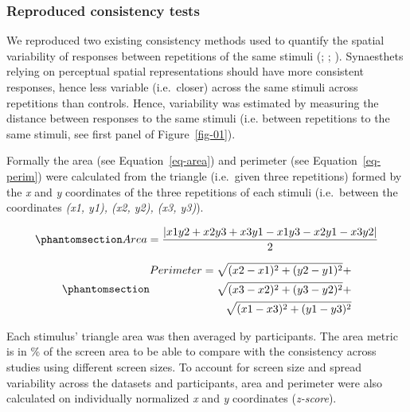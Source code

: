 \documentclass[
  man,
  floatsintext,
  longtable,
  a4paper,
  nolmodern,
  notxfonts,
  notimes,
  colorlinks=true,linkcolor=blue,citecolor=blue,urlcolor=blue]{apa7}
\begin{document}
\subsubsection{Reproduced consistency
tests}\label{reproduced-consistency-tests}

We reproduced two existing consistency methods used to quantify the
spatial variability of responses between repetitions of the same stimuli
(;
;
). Synaesthets relying on perceptual
spatial representations should have more consistent responses, hence
less variable (i.e.~closer) across the same stimuli across repetitions
than controls. Hence, variability was estimated by measuring the
distance between responses to the same stimuli (i.e. between repetitions
to the same stimuli, see first panel of Figure~\ref{fig-01}).

Formally the area (see Equation~\ref{eq-area}) and perimeter (see
Equation~\ref{eq-perim}) were calculated from the triangle (i.e.~given
three repetitions) formed by the \emph{x} and \emph{y} coordinates of
the three repetitions of each stimuli (i.e.~between the coordinates
\emph{(x1, y1), (x2, y2), (x3, y3)}).

\begin{equation}\protect\phantomsection\label{eq-area}{Area = \frac{|x1y2  +  x2y3  +  x3y1 \mathbin{-} x1y3 \mathbin{-}  x2y1 \mathbin{-} x3y2|}{2}}\end{equation}

\begin{equation}\protect\phantomsection\label{eq-perim}{\begin{split}
Perimeter = \sqrt{(x2 \mathbin{-} x1)^2 + (y2 \mathbin{-} y1)^2} + \\ \sqrt{(x3 \mathbin{-} x2)^2 + (y3 \mathbin{-} y2)^2} + \\ \sqrt{(x1 \mathbin{-}  x3)^2 + (y1 \mathbin{-} y3)^2}
\end{split}}\end{equation}

Each stimulus' triangle area was then averaged by participants. The area
metric is in \% of the screen area to be able to compare with the
consistency across studies using different screen sizes. To account for
screen size and spread variability across the datasets and participants,
area and perimeter were also calculated on individually normalized
\emph{x} and \emph{y} coordinates (\emph{z-score}).
\end{document}
